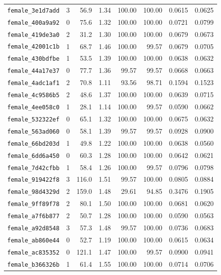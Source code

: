 \documentclass[11pt]{article}
\begin{document}
\begin{longtable}{lrrrrrrr}
\texttt{female\_3e1d7add} & 3 & 56.9 & 1.34 & 100.00 & 100.00 & 0.0615 & 0.0625 \\
\texttt{female\_400a9a92} & 0 & 75.6 & 1.32 & 100.00 & 100.00 & 0.0721 & 0.0799 \\
\texttt{female\_419de3a0} & 2 & 31.2 & 1.30 & 100.00 & 100.00 & 0.0679 & 0.0673 \\
\texttt{female\_42001c1b} & 1 & 68.7 & 1.46 & 100.00 & 99.57 & 0.0679 & 0.0705 \\
\texttt{female\_430bdfbe} & 1 & 53.5 & 1.39 & 100.00 & 100.00 & 0.0638 & 0.0632 \\
\texttt{female\_44a17e37} & 0 & 77.7 & 1.36 & 99.57 & 99.57 & 0.0668 & 0.0663 \\
\texttt{female\_4adc1af1} & 2 & 70.8 & 1.11 & 93.56 & 98.71 & 0.1594 & 0.1523 \\
\texttt{female\_4c9586b5} & 2 & 48.6 & 1.37 & 100.00 & 100.00 & 0.0639 & 0.0715 \\
\texttt{female\_4ee058c0} & 1 & 28.1 & 1.14 & 100.00 & 99.57 & 0.0590 & 0.0662 \\
\texttt{female\_532322ef} & 0 & 65.1 & 1.32 & 100.00 & 100.00 & 0.0675 & 0.0632 \\
\texttt{female\_563ad060} & 0 & 58.1 & 1.39 & 99.57 & 99.57 & 0.0928 & 0.0900 \\
\texttt{female\_66bd203d} & 1 & 49.8 & 1.22 & 100.00 & 100.00 & 0.0638 & 0.0560 \\
\texttt{female\_6dd6a450} & 0 & 60.3 & 1.28 & 100.00 & 100.00 & 0.0642 & 0.0621 \\
\texttt{female\_7d42cfbb} & 1 & 58.4 & 1.26 & 100.00 & 99.57 & 0.0796 & 0.0798 \\
\texttt{female\_919422f8} & 3 & 116.0 & 1.51 & 99.57 & 100.00 & 0.0805 & 0.0884 \\
\texttt{female\_98d4329d} & 2 & 159.0 & 1.48 & 29.61 & 94.85 & 0.3476 & 0.1905 \\
\texttt{female\_9ff89f78} & 2 & 80.1 & 1.50 & 100.00 & 100.00 & 0.0681 & 0.0620 \\
\texttt{female\_a7f6b877} & 2 & 50.7 & 1.28 & 100.00 & 100.00 & 0.0590 & 0.0563 \\
\texttt{female\_a92d8548} & 3 & 57.3 & 1.48 & 99.57 & 100.00 & 0.0736 & 0.0683 \\
\texttt{female\_ab860e44} & 0 & 52.7 & 1.19 & 100.00 & 100.00 & 0.0615 & 0.0634 \\
\texttt{female\_ac835352} & 0 & 121.1 & 1.47 & 100.00 & 99.57 & 0.0900 & 0.0941 \\
\texttt{female\_b366326b} & 1 & 61.4 & 1.55 & 100.00 & 100.00 & 0.0714 & 0.0706 \\

\end{longtable}
\end{document}
